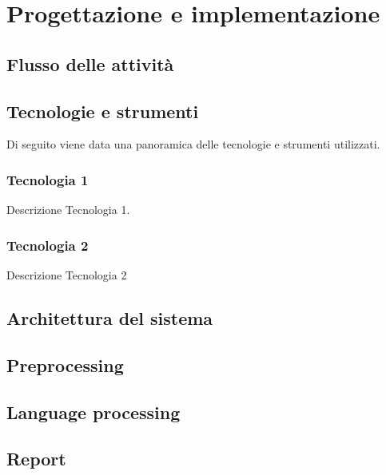 \chapter{Progettazione e implementazione}
\label{cap:progettazione-implementazione}


\section{Flusso delle attività}


\section{Tecnologie e strumenti}
\label{sec:tecnologie-strumenti}

Di seguito viene data una panoramica delle tecnologie e strumenti utilizzati.

\subsection{Tecnologia 1}
Descrizione Tecnologia 1.

\subsection{Tecnologia 2}
Descrizione Tecnologia 2


\section{Architettura del sistema}

\section{Preprocessing}
\label{sec:preprocessing}

\section{Language processing}
\label{sec:language-processing}

\section{Report}
